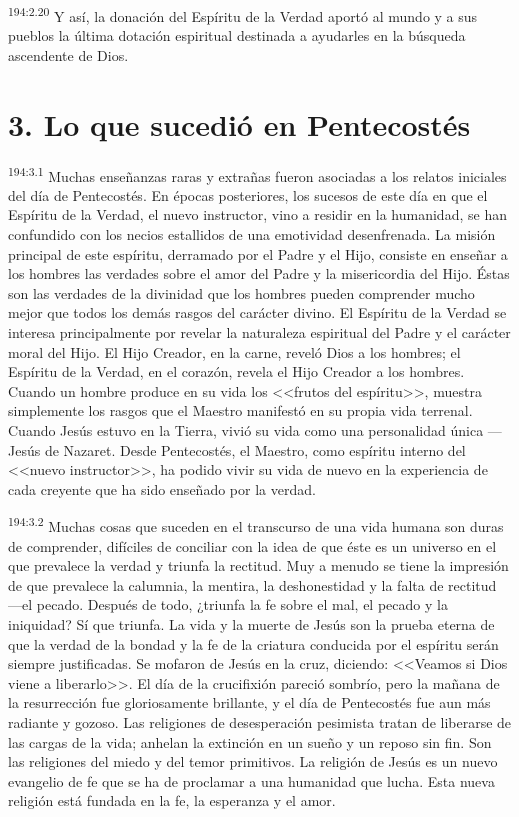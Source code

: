 \par 
\textsuperscript{194:2.20} Y así, la donación del Espíritu de la Verdad aportó al mundo y a sus pueblos la última dotación espiritual destinada a ayudarles en la búsqueda ascendente de Dios.

\section*{3. Lo que sucedió en Pentecostés}
\par 
\textsuperscript{194:3.1} Muchas enseñanzas raras y extrañas fueron asociadas a los relatos iniciales del día de Pentecostés. En épocas posteriores, los sucesos de este día en que el Espíritu de la Verdad, el nuevo instructor, vino a residir en la humanidad, se han confundido con los necios estallidos de una emotividad desenfrenada. La misión principal de este espíritu, derramado por el Padre y el Hijo, consiste en enseñar a los hombres las verdades sobre el amor del Padre y la misericordia del Hijo. Éstas son las verdades de la divinidad que los hombres pueden comprender mucho mejor que todos los demás rasgos del carácter divino. El Espíritu de la Verdad se interesa principalmente por revelar la naturaleza espiritual del Padre y el carácter moral del Hijo. El Hijo Creador, en la carne, reveló Dios a los hombres; el Espíritu de la Verdad, en el corazón, revela el Hijo Creador a los hombres. Cuando un hombre produce en su vida los <<frutos del espíritu>>, muestra simplemente los rasgos que el Maestro manifestó en su propia vida terrenal. Cuando Jesús estuvo en la Tierra, vivió su vida como una personalidad única ---Jesús de Nazaret. Desde Pentecostés, el Maestro, como espíritu interno del <<nuevo instructor>>, ha podido vivir su vida de nuevo en la experiencia de cada creyente que ha sido enseñado por la verdad.

\par 
\textsuperscript{194:3.2} Muchas cosas que suceden en el transcurso de una vida humana son duras de comprender, difíciles de conciliar con la idea de que éste es un universo en el que prevalece la verdad y triunfa la rectitud. Muy a menudo se tiene la impresión de que prevalece la calumnia, la mentira, la deshonestidad y la falta de rectitud ---el pecado. Después de todo, ¿triunfa la fe sobre el mal, el pecado y la iniquidad? Sí que triunfa. La vida y la muerte de Jesús son la prueba eterna de que la verdad de la bondad y la fe de la criatura conducida por el espíritu serán siempre justificadas. Se mofaron de Jesús en la cruz, diciendo: <<Veamos si Dios viene a liberarlo>>. El día de la crucifixión pareció sombrío, pero la mañana de la resurrección fue gloriosamente brillante, y el día de Pentecostés fue aun más radiante y gozoso. Las religiones de desesperación pesimista tratan de liberarse de las cargas de la vida; anhelan la extinción en un sueño y un reposo sin fin. Son las religiones del miedo y del temor primitivos. La religión de Jesús es un nuevo evangelio de fe que se ha de proclamar a una humanidad que lucha. Esta nueva religión está fundada en la fe, la esperanza y el amor.

